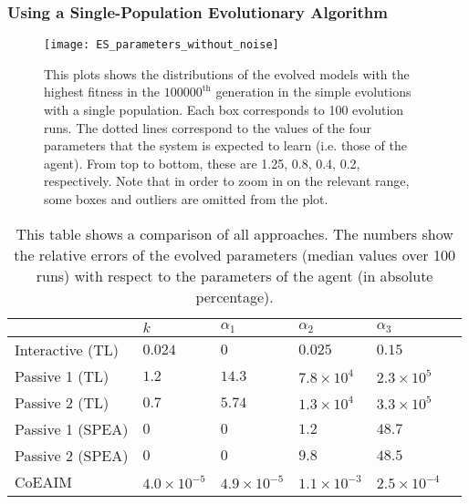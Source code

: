 \subsubsection{Using a Single-Population Evolutionary Algorithm}\label{sec:single_population_EA_deterministic_interaction}
\begin{figure}[!t]
	\centering
	\texttt{[image: ES\_parameters\_without\_noise]}
	\caption{This plots shows the distributions of the evolved models with the highest fitness in the $100000^\textrm{th}$ generation in the simple evolutions with a single population. Each box corresponds to 100 evolution runs. The dotted lines correspond to the values of the four parameters that the system is expected to learn (i.e. those of the agent). From top to bottom, these are 1.25, 0.8, 0.4, 0.2, respectively. Note that in order to zoom in on the relevant range, some boxes and outliers are omitted from the plot. \label{fig:evolution}}
\end{figure}

\begin{table}[!t] 
\caption{This table shows a comparison of all approaches. The numbers show the relative errors of the evolved parameters (median values over 100 runs) with respect to the parameters of the agent (in absolute percentage).} 
\renewcommand{\arraystretch}{1.1}
\centering %
\begin{tabular}{l l l l l l} %
\hline\hline  %
 & $k$ & $\alpha_1$ & $\alpha_2$ & $\alpha_3$ &  \\  
\hline   %
Interactive (TL) & $0.024$ & $0$ & $0.025$ & $0.15$\\ %
Passive 1 (TL) & $1.2$ & $14.3$ & $7.8\times10^4$ & $2.3\times10^5$\\ 
Passive 2 (TL) & $0.7$ & $5.74$ & $1.3\times10^4$ & $3.3\times10^5$\\ 
Passive 1 (SPEA) & $0$ & $0$ & $1.2$ & $48.7$ \\ 
Passive 2 (SPEA) & $0$ & $0$ & $9.8$ & $48.5$ \\  %
CoEAIM & $4.0\times10^{-5}$ & $4.9\times10^{-5}$ & $1.1\times10^{-3}$ & $2.5\times10^{-4}$ \\  %
\hline %
\end{tabular} 
\label{table:relative_accuracy} %
\end{table} 

